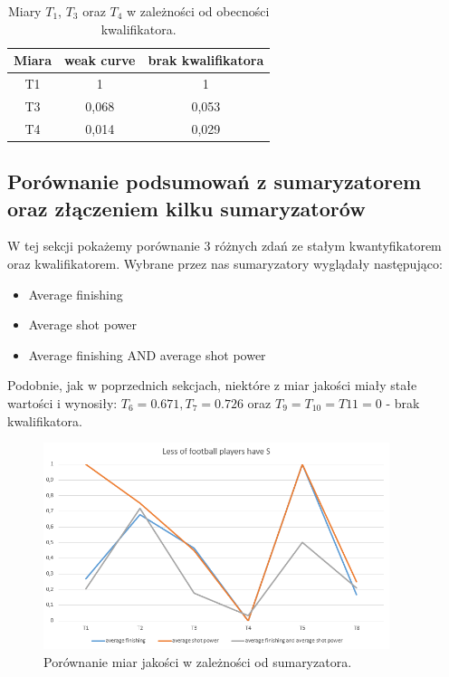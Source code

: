 \documentclass{classrep}
\begin{document}
	\begin{table}[h!]
		\centering
		\begin{tabular} {c c c}
			\hline
			\textbf{Miara} & \textbf{weak curve} & \textbf{brak kwalifikatora} \\ [0.5ex] 
			\hline	
			\hline 
			T1	& 1 &	1 \\
			T3	& 0,068 &	0,053\\
			T4	& 0,014 &	0,029 \\			
			\hline			
		\end{tabular}
		\caption{Miary $T_1$, $T_3$ oraz $T_4$ w zależności od obecności kwalifikatora. }
		\label{tabelaex2b}
	\end{table}

	\newpage
	\subsection{Porównanie podsumowań z sumaryzatorem oraz złączeniem kilku sumaryzatorów}
	W tej sekcji pokażemy porównanie 3 różnych zdań ze stałym kwantyfikatorem oraz kwalifikatorem. 
	Wybrane przez nas sumaryzatory wyglądały następująco:
	\begin{itemize}
		\item Average finishing
		\item Average shot power
		\item Average finishing AND average shot power
	\end{itemize}

	Podobnie, jak w poprzednich sekcjach, niektóre z miar jakości miały stałe wartości i wynosiły: $ T_6 = 0.671, T_7 = 0.726$  oraz $T_9 = T_{10} = T{11} = 0$ - brak kwalifikatora.

	\begin{figure}[h!]
		\centering
		\includegraphics[width=0.9\textwidth]{ex/3a.png}
		\caption{Porównanie miar jakości w zależności od sumaryzatora.}
		\label{wyniki3a}
	\end{figure}
	
\end{document}
